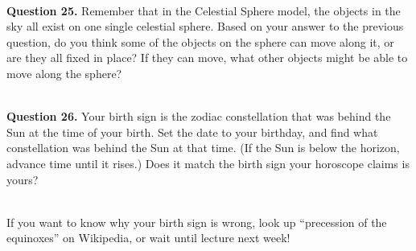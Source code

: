 \documentclass[11pt]{article}
\begin{document}
\hrulefill\\

\newpage

\textbf{Question 25.} Remember that in the Celestial Sphere model, the objects in the sky all exist on one single celestial sphere. Based on your answer to the previous question, do you think some of the objects on the sphere can move along it, or are they all fixed in place? If they can move, what other objects might be able to move along the sphere? \\
\vspace*{1.5cm}

\hrulefill\\

\textbf{Question 26.} Your birth sign is the zodiac constellation that was behind the Sun at the time of your birth. Set the date to your birthday, and find what constellation was behind the Sun at that time. (If the Sun is below the horizon, advance time until it rises.) Does it match the birth sign your horoscope claims is yours?\\
\vspace*{1.5cm}

\hrulefill\\
If you want to know why your birth sign is wrong, look up ``precession of the equinoxes'' on Wikipedia, or wait until lecture next week!
\end{document}

